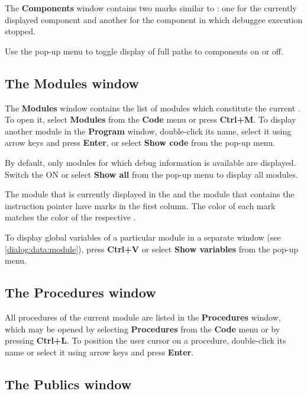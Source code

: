 
The {\bf Components} window contains two marks similar to
: one for the currently
displayed component and another for the component in which
debuggee execution stopped.

Use the pop-up menu to toggle display of full paths to components
on or off.

\subsection{The Modules window}
\label{dialog:navigating:modules}

The {\bf Modules} window contains the list of modules which constitute
the current .
To open it, select {\bf Modules} from the {\bf Code}
menu or press {\bf Ctrl+M}. To display another module in the
{\bf Program} window, double-click its name, select it using arrow
keys and press {\bf Enter}, or select {\bf Show code} from the pop-up menu.

By default, only modules for which debug information is available
are displayed. Switch the 
ON or select {\bf Show all} from the pop-up menu to display
all modules.

The module that is currently displayed in the 
 and the module that contains
the instruction pointer have marks in the first column. The color
of each mark matches the color of the respective
.

To display global variables of a particular module in a separate window
(see \ref{dialog:data:module}), press {\bf Ctrl+V} or select 
{\bf Show variables} from the pop-up menu.

\subsection{The Procedures window}
\label{dialog:navigating:procedures}

All procedures of the current module are listed in the {\bf Procedures}
window, which may be opened by selecting {\bf Procedures} from
the {\bf Code} menu or by pressing {\bf Ctrl+L}. To position the user cursor
on a procedure, double-click its name or select it using arrow
keys and press {\bf Enter}.

\subsection{The Publics window}
\label{dialog:navigating:publics}


